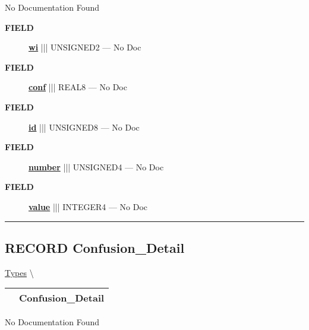 \par





No Documentation Found







\par
\begin{description}
\item [\colorbox{tagtype}{\color{white} \textbf{\textsf{FIELD}}}] \textbf{\underline{wi}} ||| UNSIGNED2 --- No Doc
\item [\colorbox{tagtype}{\color{white} \textbf{\textsf{FIELD}}}] \textbf{\underline{conf}} ||| REAL8 --- No Doc
\item [\colorbox{tagtype}{\color{white} \textbf{\textsf{FIELD}}}] \textbf{\underline{id}} ||| UNSIGNED8 --- No Doc
\item [\colorbox{tagtype}{\color{white} \textbf{\textsf{FIELD}}}] \textbf{\underline{number}} ||| UNSIGNED4 --- No Doc
\item [\colorbox{tagtype}{\color{white} \textbf{\textsf{FIELD}}}] \textbf{\underline{value}} ||| INTEGER4 --- No Doc
\end{description}





\rule{\linewidth}{0.5pt}
\subsection*{\textsf{\colorbox{headtoc}{\color{white} RECORD}
Confusion\_Detail}}

\hypertarget{ecldoc:ml_core.types.confusion_detail}{}
\hspace{0pt} \hyperlink{ecldoc:ML_Core.Types}{Types} \textbackslash 

{\renewcommand{\arraystretch}{1.5}
\begin{tabularx}{\textwidth}{|>{\raggedright\arraybackslash}l|X|}
\hline
\hspace{0pt}\mytexttt{\color{red} } & \textbf{Confusion\_Detail} \\
\hline
\end{tabularx}
}

\par





No Documentation Found







